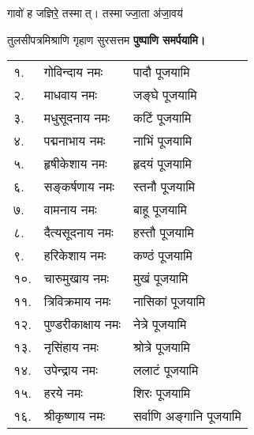 \begin{center}
{गावो॑ ह जज्ञिरे॒ तस्मात्। तस्माज्जा॒ता अ॑जा॒वय॑}

{तुलसीपत्रमिश्राणि गृहाण सुरसत्तम}
\textbf{\devAya{} पुष्पाणि समर्पयामि।}


\begin{longtable}{ll@{—}l}
१. & गोविन्दाय नमः & पादौ पूजयामि \\
२. & माधवाय नमः &  जङ्घे पूजयामि \\
३. & मधुसूदनाय नमः & कटिं पूजयामि \\
४. & पद्मनाभाय नमः & नाभिं पूजयामि \\
५. & हृषीकेशाय नमः & हृदयं पूजयामि \\
६. & सङ्कर्षणाय नमः & स्तनौ पूजयामि \\
७. & वामनाय नमः & बाहू पूजयामि \\
८. & दैत्यसूदनाय नमः & हस्तौ पूजयामि \\
९. & हरिकेशाय नमः & कण्ठं पूजयामि \\
१०. & चारुमुखाय नमः & मुखं पूजयामि \\
११. & त्रिविक्रमाय नमः & नासिकां पूजयामि \\
१२. & पुण्डरीकाक्षाय नमः & नेत्रे पूजयामि \\
१३. & नृसिंहाय नमः & श्रोत्रे पूजयामि \\
१४. & उपेन्द्राय नमः & ललाटं पूजयामि \\
१५. & हरये नमः & शिरः पूजयामि \\
१६. & श्रीकृष्णाय नमः & सर्वाणि अङ्गानि पूजयामि \\
\end{longtable}


\end{center}
